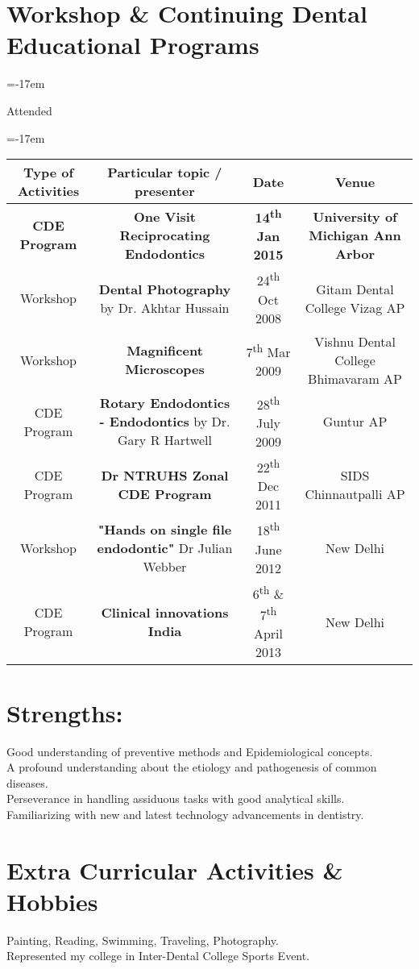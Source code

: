\documentclass[]{friggeri-cv} %
\newcommand{\negparr}[1][-17em]{%
  \ifvmode\else\par\fi
  {\parindent=#1\leavevmode}\ignorespaces
}
\begin{document}
\section{Workshop \& Continuing Dental Educational Programs}
\negparr
{\small Attended}

\negparr
\begin{tabular}{|c |c |c |c|}
\hline
    {\bf Type of Activities}	&	{\bf Particular topic / presenter}		&	{\bf Date}	&	 {\bf Venue}\\
\hline
    {\bf CDE Program}	&	{\bf One Visit Reciprocating Endodontics}		&	{\bf 14\textsuperscript{th} Jan 2015}	&	{\bf University of Michigan Ann Arbor} \\
\hline
Workshop		&	{\bf Dental Photography} by Dr. Akhtar Hussain	&	24\textsuperscript{th} Oct 2008		&	Gitam Dental College Vizag AP\\
\hline
Workshop		&	{\bf Magnificent Microscopes}	&	7\textsuperscript{th} Mar 2009	&	Vishnu Dental College Bhimavaram AP\\
\hline
CDE	Program	& 	{\bf Rotary Endodontics - Endodontics} by Dr. Gary R Hartwell	& 28\textsuperscript{th} July 2009	&	Guntur AP\\
\hline
CDE Program	&	{\bf Dr NTRUHS Zonal CDE Program}	& 22\textsuperscript{th} Dec 2011	&	SIDS Chinnautpalli AP\\
\hline
Workshop		&	{\bf "Hands on single file endodontic"} Dr Julian Webber	& 18\textsuperscript{th} June 2012	&	New Delhi\\
\hline
CDE Program	&	{\bf Clinical innovations India}	&	6\textsuperscript{th} \& 7\textsuperscript{th} April 2013	&	New Delhi\\
\hline
\end{tabular}

\newpage
\section{Strengths:}
Good understanding of preventive methods and Epidemiological concepts.\\
A profound understanding about the etiology and pathogenesis of common diseases.\\
Perseverance in handling assiduous tasks with good analytical skills.\\
Familiarizing with new and latest technology advancements in dentistry.

\section{Extra Curricular Activities \& Hobbies }
Painting, Reading, Swimming, Traveling, Photography.\\
Represented my college in Inter-Dental College Sports Event.
\end{document}
